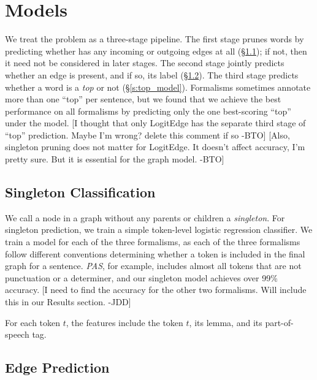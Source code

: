 \documentclass[11pt]{article}
\newcommand{\bocomment}[1]{\textcolor{Bittersweet}{[#1 -BTO]}}
\newcommand{\jdcomment}[1]{\textcolor{NavyBlue}{[#1 -JDD]}}
\begin{document}
\section{Models} \label{s:models}

We treat the problem as a three-stage pipeline.
The first stage prunes words by predicting whether has any incoming or
outgoing edges at all (\S\ref{s:singleton_model}); if not, then it need not be 
considered in later stages.
The second stage jointly predicts whether an edge is
present, and if so, its label (\S\ref{s:edge_model}).
The third stage predicts whether a word is a \emph{top} or not
(\S\ref{s:top_model}).
Formalisms sometimes annotate more than one ``top'' per sentence, but we
found that we achieve the best performance on all formalisms by predicting only
the one best-scoring ``top'' under the model.
\bocomment{I thought that only LogitEdge has the separate third stage of ``top'' prediction. Maybe I'm wrong? delete this comment if so}
\bocomment{Also, singleton pruning does not matter for LogitEdge.  It doesn't affect accuracy, I'm pretty sure.  But it is essential for the graph model.}


\subsection{Singleton Classification} \label{s:singleton_model}

We call a node in a graph without any parents or children a \emph{singleton}.
For singleton prediction, we train a simple token-level logistic regression
classifier.
We train a model for each of the three formalisms, as each of the three
formalisms follow different conventions determining whether a token is
included in the final graph for a sentence.
\emph{PAS}, for example, includes almost all tokens that are not
punctuation or a determiner, and our singleton model achieves over 99\%
accuracy.
\jdcomment{I need to find the accuracy for the other two formalisms. Will
include this in our Results section.}

For each token $t$, the features include
the token $t$, its lemma, and its part-of-speech tag.



\subsection{Edge Prediction} \label{s:edge_model}
\end{document}

